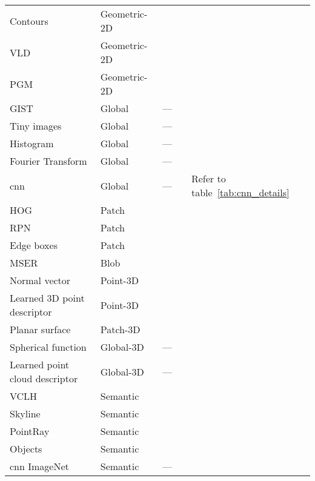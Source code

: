 \begin{landscape}
\begin{table}[t]
{\begin{tabular}{l l c c l}
			Contours \citep{canny1986computational}				& Geometric-2D		& \cmark	& \xmark		& \citep{Ramalingam2010,Russell2011} \\
			VLD \citep{Liu2012}			& Geometric-2D		& \xmark	& \cmark		& \citep{Majdik2013} \\
            PGM \citep{Li2015}			& Geometric-2D		& \xmark	& \cmark		& \citep{Li2015} \\
			\hline
			GIST \citep{Oliva2001} 			& Global 		& ---		& \cmark		& \citep{Hays2008,Russell2011,Murillo2013,Azzi2016} \\
			Tiny images			& Global		& ---		& \cmark		& \citep{Hays2008,Gee2012,Corke2013} \\
			Histogram			& Global		& ---		& \cmark		& \citep{Hays2008,Ni2009} \\
			Fourier Transform	& Global		& ---		& \cmark		& \citep{Wan2016} \\
			\Ac*{cnn} 			& Global		& ---		& \cmark		& Refer to table~\ref{tab:cnn_details} \\
			\hline
			HOG \citep{Dalal2005}			& Patch			& \xmark	& \cmark		& \citep{Shrivastava2011,Aubry2014,McManus2014,Morago2016} \\
			RPN \citep{Ren2015} 			& Patch 		& \cmark	& \xmark		& \citep{Gordo2016} \\
			Edge boxes \citep{Zitnick2014}		& Patch			& \cmark	& \xmark		& \citep{Sunderhauf2015a,Panphattarasap2016,Yan2016} \\
			MSER \citep{Matas2004}			& Blob			& \cmark	& \xmark		& \citep{Kim2015,Nister2006} \\
			\hline
			Normal vector		& Point-3D			& \cmark	& \xmark		& \citep{Li2016,Fernandez-Moral2013} \\
			Learned 3D point descriptor			& Point-3D			& \xmark	& \cmark		& \citep{Zeng2016,Deng2018,Yew2018}\\
			Planar surface & Patch-3D			& \cmark	& \xmark		& \citep{Fernandez-Moral2013} \\			
			Spherical function \citep{Saupe2001}			& Global-3D			& ---	& \cmark		& \citep{Lu2015}\\
			Learned point cloud descriptor		& Global-3D			& ---	& \cmark		& \citep{Uy2018,Schonberger2017a}\\
			\hline
			VCLH \citep{Cham2010}			& Semantic		& \cmark	& \cmark		& \citep{Cham2010} \\
            Skyline							& Semantic		& \cmark	& \cmark		& \citep{Baatz2012,Tzeng2013,Chen2015} \\
			PointRay \citep{Bansal2014}		& Semantic		& \cmark	& \cmark		& \citep{Bansal2014} \\
			Objects	 						& Semantic		& \cmark	& \xmark		& \citep{Lu2015,Salas-Moreno2013,Ardeshir2014,Qu2015} \\
			\acs*{cnn} ImageNet \citep{Krizhevsky2012} 	& Semantic 		& ---		& \cmark		& \citep{Sunderhauf2015} \\			
			\hline
		\end{tabular}
	}
\end{table}
\end{landscape}